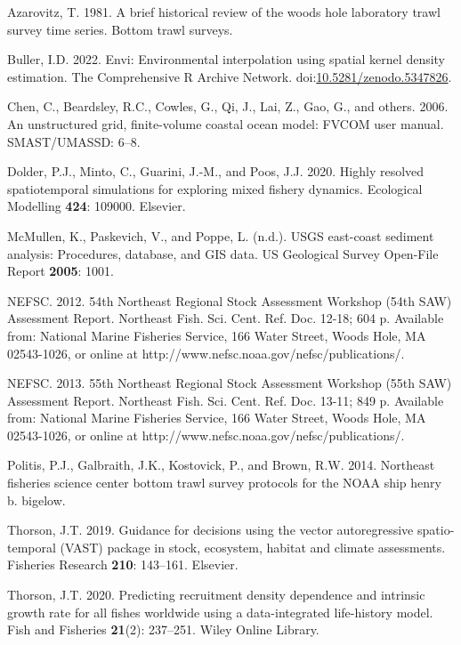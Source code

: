\documentclass[
  12pt,
]{article}
\newlength{\cslhangindent}
\newlength{\cslentryspacingunit} %
\newenvironment{CSLReferences}[2] %
 {%
  \setlength{\parindent}{0pt}
  \ifodd #1
  \let\oldpar\par
  \def\par{\hangindent=\cslhangindent\oldpar}
  \fi
  \setlength{\parskip}{#2\cslentryspacingunit}
 }%
 {}
\begin{document}
\hypertarget{refs}{}
\begin{CSLReferences}{1}{0}
\leavevmode{}%
Azarovitz, T. 1981. A brief historical review of the woods hole laboratory trawl survey time series. Bottom trawl surveys.

\leavevmode{}%
Buller, I.D. 2022. Envi: Environmental interpolation using spatial kernel density estimation. The Comprehensive R Archive Network. doi:\href{https://doi.org/10.5281/zenodo.5347826}{10.5281/zenodo.5347826}.

\leavevmode{}%
Chen, C., Beardsley, R.C., Cowles, G., Qi, J., Lai, Z., Gao, G., and others. 2006. An unstructured grid, finite-volume coastal ocean model: FVCOM user manual. SMAST/UMASSD: 6--8.

\leavevmode{}%
Dolder, P.J., Minto, C., Guarini, J.-M., and Poos, J.J. 2020. Highly resolved spatiotemporal simulations for exploring mixed fishery dynamics. Ecological Modelling \textbf{424}: 109000. Elsevier.

\leavevmode{}%
McMullen, K., Paskevich, V., and Poppe, L. (n.d.). USGS east-coast sediment analysis: Procedures, database, and GIS data. US Geological Survey Open-File Report \textbf{2005}: 1001.

\leavevmode{}%
NEFSC. 2012. {54th Northeast Regional Stock Assessment Workshop (54th SAW) Assessment Report}. {Northeast Fish. Sci. Cent. Ref. Doc. 12-18; 604 p. Available from: National Marine Fisheries Service, 166 Water Street, Woods Hole, MA 02543-1026, or online at http://www.nefsc.noaa.gov/nefsc/publications/}.

\leavevmode{}%
NEFSC. 2013. {55th Northeast Regional Stock Assessment Workshop (55th SAW) Assessment Report}. {Northeast Fish. Sci. Cent. Ref. Doc. 13-11; 849 p. Available from: National Marine Fisheries Service, 166 Water Street, Woods Hole, MA 02543-1026, or online at http://www.nefsc.noaa.gov/nefsc/publications/}.

\leavevmode{}%
Politis, P.J., Galbraith, J.K., Kostovick, P., and Brown, R.W. 2014. Northeast fisheries science center bottom trawl survey protocols for the NOAA ship henry b. bigelow.

\leavevmode{}%
Thorson, J.T. 2019. Guidance for decisions using the vector autoregressive spatio-temporal (VAST) package in stock, ecosystem, habitat and climate assessments. Fisheries Research \textbf{210}: 143--161. Elsevier.

\leavevmode{}%
Thorson, J.T. 2020. Predicting recruitment density dependence and intrinsic growth rate for all fishes worldwide using a data-integrated life-history model. Fish and Fisheries \textbf{21}(2): 237--251. Wiley Online Library.

\end{CSLReferences}
\end{document}
